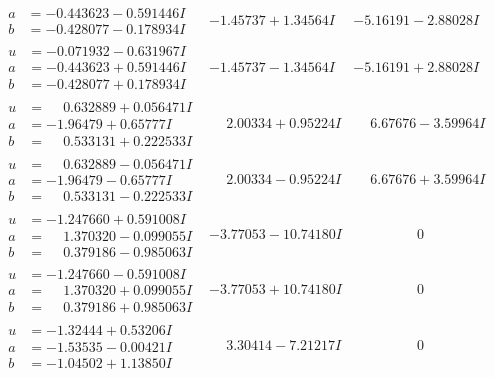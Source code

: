 \documentclass[1p]{elsarticle_modified}
\theoremstyle{definition}
\begin{document}
$$\begin{array}{c|c|c}
\begin{aligned}
a &= -0.443623 - 0.591446 I \\
b &= -0.428077 - 0.178934 I\end{aligned}
 & -1.45737 + 1.34564 I & -5.16191 - 2.88028 I \\ \hline\begin{aligned}
u &= -0.071932 - 0.631967 I \\
a &= -0.443623 + 0.591446 I \\
b &= -0.428077 + 0.178934 I\end{aligned}
 & -1.45737 - 1.34564 I & -5.16191 + 2.88028 I \\ \hline\begin{aligned}
u &= \phantom{-}0.632889 + 0.056471 I \\
a &= -1.96479 + 0.65777 I \\
b &= \phantom{-}0.533131 + 0.222533 I\end{aligned}
 & \phantom{-}2.00334 + 0.95224 I & \phantom{-}6.67676 - 3.59964 I \\ \hline\begin{aligned}
u &= \phantom{-}0.632889 - 0.056471 I \\
a &= -1.96479 - 0.65777 I \\
b &= \phantom{-}0.533131 - 0.222533 I\end{aligned}
 & \phantom{-}2.00334 - 0.95224 I & \phantom{-}6.67676 + 3.59964 I \\ \hline\begin{aligned}
u &= -1.247660 + 0.591008 I \\
a &= \phantom{-}1.370320 - 0.099055 I \\
b &= \phantom{-}0.379186 - 0.985063 I\end{aligned}
 & -3.77053 - 10.74180 I & \phantom{-0.000000 } 0 \\ \hline\begin{aligned}
u &= -1.247660 - 0.591008 I \\
a &= \phantom{-}1.370320 + 0.099055 I \\
b &= \phantom{-}0.379186 + 0.985063 I\end{aligned}
 & -3.77053 + 10.74180 I & \phantom{-0.000000 } 0 \\ \hline\begin{aligned}
u &= -1.32444 + 0.53206 I \\
a &= -1.53535 - 0.00421 I \\
b &= -1.04502 + 1.13850 I\end{aligned}
 & \phantom{-}3.30414 - 7.21217 I & \phantom{-0.000000 } 0 \\ \hline\begin{aligned}

\end{aligned}
\end{array}$$
\end{document}
